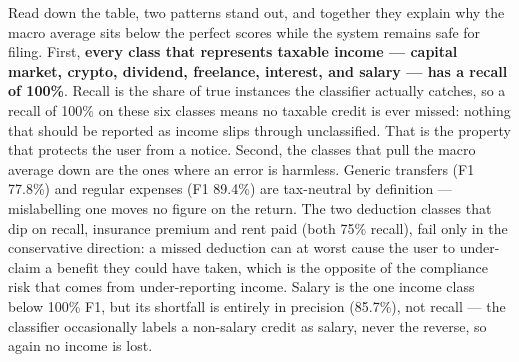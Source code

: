 \documentclass[12pt, a4paper, oneside]{report}
\begin{document}
Read down the table, two patterns stand out, and together they explain why the
macro average sits below the perfect scores while the system remains safe for
filing. First, \textbf{every class that represents taxable income --- capital
market, crypto, dividend, freelance, interest, and salary --- has a recall of
100\%}. Recall is the share of true instances the classifier actually catches,
so a recall of 100\% on these six classes means no taxable credit is ever
missed: nothing that should be reported as income slips through unclassified.
That is the property that protects the user from a notice. Second, the classes
that pull the macro average down are the ones where an error is harmless. Generic
transfers (F1 77.8\%) and regular expenses (F1 89.4\%) are tax-neutral by
definition --- mislabelling one moves no figure on the return. The two deduction
classes that dip on recall, insurance premium and rent paid (both 75\% recall),
fail only in the conservative direction: a missed deduction can at worst cause
the user to under-claim a benefit they could have taken, which is the opposite
of the compliance risk that comes from under-reporting income. Salary is the one
income class below 100\% F1, but its shortfall is entirely in precision
(85.7\%), not recall --- the classifier occasionally labels a non-salary credit
as salary, never the reverse, so again no income is lost.
\end{document}
